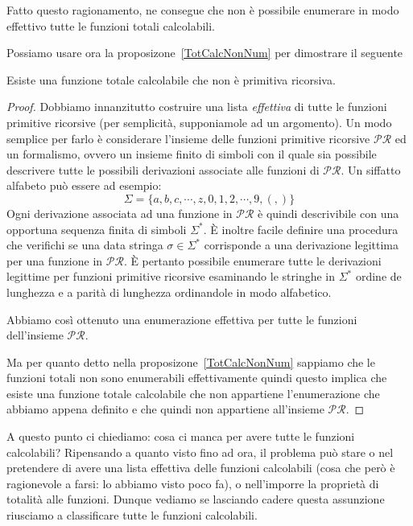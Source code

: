 Fatto questo ragionamento, ne consegue che non è possibile enumerare
in modo effettivo tutte le funzioni totali calcolabili.

Possiamo usare ora la proposizone~\ref{TotCalcNonNum} per dimostrare il seguente

\begin{teorema}\label{diagRic} Esiste una funzione totale calcolabile che non
è primitiva ricorsiva.
\end{teorema}

\begin{proof} Dobbiamo innanzitutto costruire una lista \emph{effettiva} di
tutte le funzioni primitive ricorsive (per semplicità, supponiamole ad
un argomento).  Un modo semplice per farlo è considerare l'insieme
delle funzioni primitive ricorsive $\mathcal{PR}$ ed un formalismo,
ovvero un insieme finito di simboli con il quale sia possibile
descrivere tutte le possibili derivazioni associate alle funzioni di
$\mathcal{PR}$. Un siffatto alfabeto può essere ad esempio:
$$\Sigma = \lbrace a, b, c, \cdots ,z , 0, 1, 2, \cdots , 9, (, ) \rbrace$$
Ogni derivazione associata ad una funzione in $\mathcal{PR}$ \`e quindi
descrivibile con una opportuna sequenza finita di simboli $\Sigma^{*}$. \`E
inoltre facile definire una procedura che verifichi se una data stringa $\sigma
\in \Sigma^{*}$ corrisponde a una derivazione legittima per una funzione in
$\mathcal{PR}$. \`E pertanto possibile enumerare tutte le derivazioni legittime
per funzioni primitive ricorsive esaminando le stringhe in $\Sigma^{*}$ ordine
de lunghezza e a parit\`a di lunghezza ordinandole in modo alfabetico.

Abbiamo cos\`i ottenuto una enumerazione effettiva per tutte le funzioni
dell'insieme $\mathcal{PR}$.

Ma per quanto detto nella proposizone~\ref{TotCalcNonNum} sappiamo che le
funzioni totali non sono enumerabili effettivamente quindi questo implica che
esiste una funzione totale calcolabile che non appartiene l'enumerazione che
abbiamo appena definito e che quindi non appartiene all'insieme $\mathcal{PR}$.
\end{proof}

A questo punto ci chiediamo: cosa ci manca per avere tutte le funzioni
calcolabili?
Ripensando a quanto visto fino ad ora, il problema pu\`o stare o nel pretendere
di avere una lista effettiva delle funzioni calcolabili (cosa che per\`o \`e
ragionevole a farsi: lo abbiamo visto poco fa), o nell'imporre la propriet\`a di
totalit\`a alle funzioni. Dunque vediamo se lasciando cadere questa assunzione
riusciamo a classificare tutte le funzioni calcolabili.


